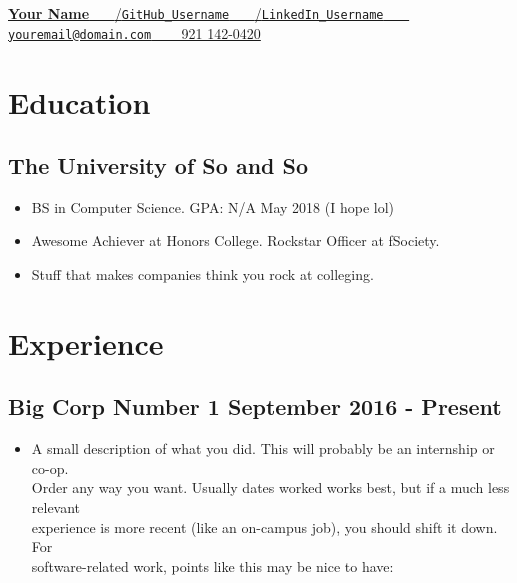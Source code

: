 \documentclass{article}
\begin{document}
{\centering 
    \underline{\textbf{\huge Your Name} \ \ \ {{{\large \faGithub}/\href{http://www.github.com/TusharRakheja}{\texttt{GitHub\_Username}}} \ \ \ {{\large \faLinkedin}/\href{http://www.linkedin.com/in/tusharrakheja}{\texttt{LinkedIn\_Username}}} \ \ \ {{\large \faEnvelope} \href{mailto:tusharrakheja@gmail.com}{\texttt{youremail@domain.com}}} \ \ \ {\large \faPhone} 921 142-0420}} \par}

\section*{Education}   

\subsection*{The University of So and So}
\begin{itemize}
    \itemsep0em
    \item BS in Computer Science. GPA: N/A \hspace{275pt} May 2018 (I hope lol)
    \item Awesome Achiever at Honors College. Rockstar Officer at fSociety.
    \item Stuff that makes companies think you rock at colleging.
\end{itemize}

\section*{Experience}   
 
\subsection*{Big Corp Number 1 \hspace{320pt} \normalsize \textmd{September 2016 - Present}}
\begin{itemize}
    \item A small description of what you did. This will probably be an internship or co-op.\\ Order any way you want. Usually dates worked works best, but if a much less relevant\\ experience is more recent (like an on-campus job), you should shift it down. For \\software-related work, points like this may be nice to have: \\
    
    \end{itemize} 
\end{document}
